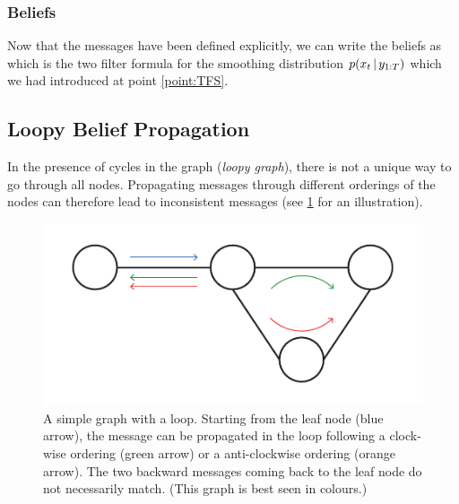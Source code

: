 \subsubsection{Beliefs}
Now that the messages have been defined explicitly, we can write the beliefs as
%
%
which is the two filter formula for the smoothing distribution $p(x_{t}\,|\, y_{1:T})$ which we had introduced at point \ref{point:TFS}.

\subsection{\label{point:LBP}Loopy Belief Propagation}

In the presence of cycles in the graph (\emph{loopy graph}), there is not a unique way to go through all nodes. 
Propagating messages through different orderings of the nodes can therefore lead to inconsistent messages (see \ref{fig:lbp-inconsistent} for an illustration).
 
\begin{figure}[!h]
\center
\includegraphics[width=.7\textwidth]{figures/lbp/loopy1}
\caption{\label{fig:lbp-inconsistent}A simple graph with a loop. Starting from the leaf node (blue arrow), the message can be propagated in the loop following a clock-wise ordering (green arrow) or a anti-clockwise ordering (orange arrow). The two backward messages coming back to the leaf node do not necessarily match. (This graph is best seen in colours.)}
\end{figure}

